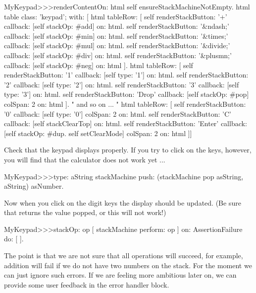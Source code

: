 \documentclass[a4paper,10pt,twoside]{book}
\begin{document}
\begin{code}{}
MyKeypad>>>renderContentOn: html 
  self ensureStackMachineNotEmpty.
  html table
    class: 'keypad';
    with: [
      html tableRow: [
          self renderStackButton: '+' callback: [self stackOp: #add] on: html.
          self renderStackButton: '&ndash;' callback: [self stackOp: #min] on: html.
          self renderStackButton: '&times;' callback: [self stackOp: #mul] on: html.
          self renderStackButton: '&divide;' callback: [self stackOp: #div] on: html.
          self renderStackButton: '&plusmn;' callback: [self stackOp: #neg] on: html ].
        html tableRow: [
          self renderStackButton: '1' callback: [self type: '1'] on: html.
          self renderStackButton: '2' callback: [self type: '2'] on: html.
          self renderStackButton: '3' callback: [self type: '3'] on: html.
          self renderStackButton: 'Drop' callback: [self stackOp: #pop]
          	colSpan: 2 on: html ].
" and so on ... "
        html tableRow: [
          self renderStackButton: '0' callback: [self type: '0'] colSpan: 2 on: html.
          self renderStackButton: 'C' callback: [self stackClearTop] on: html.
          self renderStackButton: 'Enter'
          	callback: [self stackOp: #dup. self setClearMode]
			colSpan: 2 on: html ]]
\end{code}

Check that the keypad displays properly.
If you try to click on the keys, however, you will find that the calculator does not work yet ...

\begin{code}{}
MyKeypad>>>type: aString
	stackMachine push: (stackMachine pop asString, aString) asNumber.
\end{code}
Now when you click on the digit keys the display should be updated.
(Be sure that  returns the value popped, or this will not work!)



\begin{code}{}
MyKeypad>>>stackOp: op
	[ stackMachine perform: op ] on: AssertionFailure do: [ ].
\end{code}

The point is that we are not sure that all operations will succeed, for example, addition will fail if we do not have two numbers on the stack.
For the moment we can just ignore such errors.
If we are feeling more ambitious later on, we can provide some user feedback in the error handler block.
\end{document}
